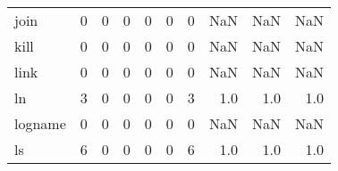 \begin{longtable}{lrrrrrrrrr}
join      &                                       0 &                                                  0 &                                                  0 &                                                  0 &                                                  0 &                                                  0 &                                                NaN &                                    NaN &                                  NaN \\
kill      &                                       0 &                                                  0 &                                                  0 &                                                  0 &                                                  0 &                                                  0 &                                                NaN &                                    NaN &                                  NaN \\
link      &                                       0 &                                                  0 &                                                  0 &                                                  0 &                                                  0 &                                                  0 &                                                NaN &                                    NaN &                                  NaN \\
ln        &                                       3 &                                                  0 &                                                  0 &                                                  0 &                                                  0 &                                                  3 &                                                1.0 &                                    1.0 &                                  1.0 \\
logname   &                                       0 &                                                  0 &                                                  0 &                                                  0 &                                                  0 &                                                  0 &                                                NaN &                                    NaN &                                  NaN \\
ls        &                                       6 &                                                  0 &                                                  0 &                                                  0 &                                                  0 &                                                  6 &                                                1.0 &                                    1.0 &                                  1.0 \\

\end{longtable}
